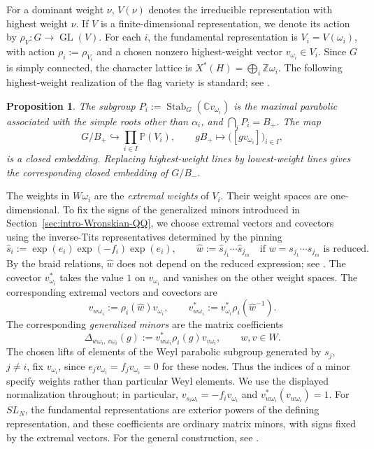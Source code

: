 \documentclass[11pt,leqno]{amsart}
\numberwithin{equation}{section}
\theoremstyle{plain}
\newtheorem{proposition}[theorem]{Proposition}
\theoremstyle{definition}
\theoremstyle{plain}
\theoremstyle{definition}
\theoremstyle{remark}
\begin{document}
For a dominant weight $\nu$, $V(\nu)$ denotes the irreducible representation with highest weight $\nu$.  If $V$ is a finite-dimensional representation, we denote its action by $\rho_V:G\to\operatorname{GL}(V)$.  For each $i$, the fundamental representation is $V_i=V(\omega_i)$, with action $\rho_i:=\rho_{V_i}$ and a chosen nonzero highest-weight vector $v_{\omega_i}\in V_i$.  Since $G$ is simply connected, the character lattice is $X^*(H)=\bigoplus_i\mathbb Z\omega_i$.
The following highest-weight realization of the flag variety is standard; see \cite[Sections~21(i) and~22(a)]{Milne2017}.
\begin{proposition}\label{prop:highest-weight-stabilizers}
The subgroup $P_i:=\operatorname{Stab}_G(\mathbb Cv_{\omega_i})$ is the maximal parabolic associated with the simple roots other than $\alpha_i$, and $\bigcap_iP_i=B_+$.  The map
\begin{equation}\label{eq:Borel-fundamental-embedding}
 G/B_+\hookrightarrow\prod_{i\in I}\mathbb P(V_i),\qquad
 gB_+\longmapsto\bigl([gv_{\omega_i}]\bigr)_{i\in I},
\end{equation}
is a closed embedding.  Replacing highest-weight lines by lowest-weight lines gives the corresponding closed embedding of $G/B_-$.
\end{proposition}

The weights in $W\omega_i$ are the \emph{extremal weights} of $V_i$.  Their weight spaces are one-dimensional.  To fix the signs of the generalized minors introduced in Section~\ref{sec:intro-Wronskian-QQ}, we choose extremal vectors and covectors using the inverse-Tits representatives determined by the pinning
\[
 \widehat s_i:=\exp(e_i)\exp(-f_i)\exp(e_i),
 \qquad
 \widehat w:=\widehat s_{j_1}\cdots\widehat s_{j_m}
 \quad\text{if }w=s_{j_1}\cdots s_{j_m}\text{ is reduced}.
\]
By the braid relations, $\widehat w$ does not depend on the reduced expression; see \cite[Section~1.4, equations~(1.8)--(1.9)]{FominZelevinsky1999}.  The covector $v_{\omega_i}^*$ takes the value $1$ on $v_{\omega_i}$ and vanishes on the other weight spaces.  The corresponding extremal vectors and covectors are
\[
 v_{w\omega_i}:=\rho_i(\widehat w)v_{\omega_i},\qquad
 v_{w\omega_i}^*:=v_{\omega_i}^*\rho_i(\widehat w^{-1}).
\]
The corresponding \emph{generalized minors} are the matrix coefficients
\[
 \Delta_{w\omega_i,\,v\omega_i}(g)
 :=v_{w\omega_i}^*\rho_i(g)v_{v\omega_i},
 \qquad w,v\in W.
\]
The chosen lifts of elements of the Weyl parabolic subgroup generated by $s_j$, $j\ne i$, fix $v_{\omega_i}$, since $e_jv_{\omega_i}=f_jv_{\omega_i}=0$ for these nodes.  Thus the indices of a minor specify weights rather than particular Weyl elements.  We use the displayed normalization throughout; in particular, $v_{s_i\omega_i}=-f_iv_{\omega_i}$ and $v_{w\omega_i}^*(v_{w\omega_i})=1$.  For $SL_N$, the fundamental representations are exterior powers of the defining representation, and these coefficients are ordinary matrix minors, with signs fixed by the extremal vectors.  For the general construction, see \cite[Definition~1.4]{FominZelevinsky1999}.
\end{document}
